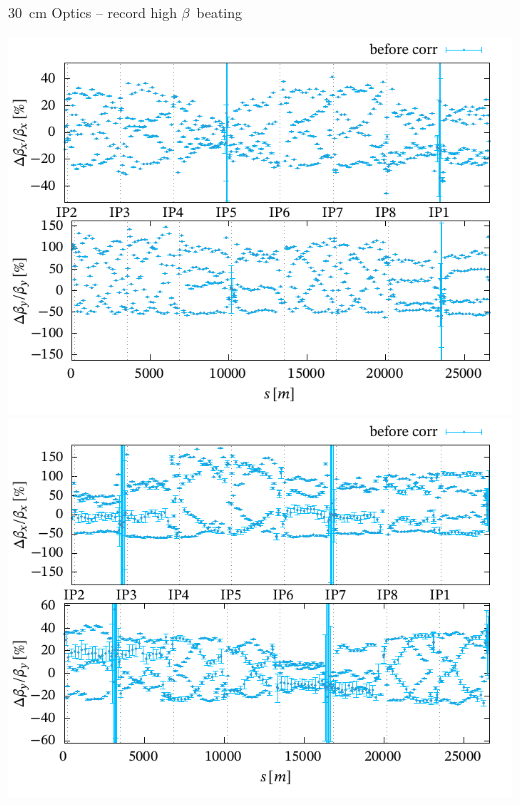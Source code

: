 \documentclass[11pt,usenames,dvipsnames,aspectratio=169]{beamer}
\begin{document}
\begin{frame}{\SI{30}{cm} Optics -- record high $\beta$~beating}

    \includegraphics[width=0.49\linewidth]{images/squeeze/b1_recordhigh.pdf}
    \hfill
    \includegraphics[width=0.49\linewidth]{images/squeeze/b2_recordhigh.pdf}
    
\end{frame}
\end{document}
